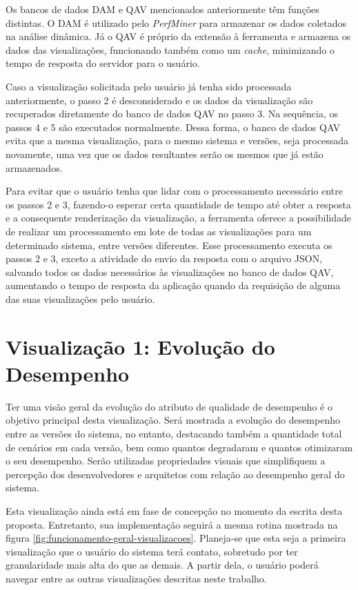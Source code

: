 Os bancos de dados DAM e QAV mencionados anteriormente têm funções distintas. O DAM é utilizado pelo \textit{PerfMiner} para armazenar os dados coletados na análise dinâmica. Já o QAV é próprio da extensão à ferramenta e armazena os dados das visualizações, funcionando também como um \textit{cache}, minimizando o tempo de resposta do servidor para o usuário.

Caso a visualização solicitada pelo usuário já tenha sido processada anteriormente, o passo 2 é desconsiderado e os dados da visualização são recuperados diretamente do banco de dados QAV no passo 3. Na sequência, os passos 4 e 5 são executados normalmente. Dessa forma, o banco de dados QAV evita que a mesma visualização, para o mesmo sistema e versões, seja processada novamente, uma vez que os dados resultantes serão os mesmos que já estão armazenados.

Para evitar que o usuário tenha que lidar com o processamento necessário entre os passos 2 e 3, fazendo-o esperar certa quantidade de tempo até obter a resposta e a consequente renderização da visualização, a ferramenta oferece a possibilidade de realizar um processamento em lote de todas as visualizações para um determinado sistema, entre versões diferentes. Esse processamento executa os passos 2 e 3, exceto a atividade do envio da resposta com o arquivo JSON, salvando todos os dados necessários às visualizações no banco de dados QAV, aumentando o tempo de resposta da aplicação quando da requisição de alguma das suas visualizações pelo usuário.

\section{Visualização 1: Evolução do Desempenho} \label{sec:visualizacao1}

Ter uma visão geral da evolução do atributo de qualidade de desempenho é o objetivo principal desta visualização. Será mostrada a evolução do desempenho entre as versões do sistema, no entanto, destacando também a quantidade total de cenários em cada versão, bem como quantos degradaram e quantos otimizaram o seu desempenho. Serão utilizadas propriedades visuais que simplifiquem a percepção dos desenvolvedores e arquitetos com relação ao desempenho geral do sistema.

Esta visualização ainda está em fase de concepção no momento da escrita desta proposta. Entretanto, sua implementação seguirá a mesma rotina mostrada na figura \ref{fig:funcionamento-geral-visualizacoes}. Planeja-se que esta seja a primeira visualização que o usuário do sistema terá contato, sobretudo por ter granularidade mais alta do que as demais. A partir dela, o usuário poderá navegar entre as outras visualizações descritas neste trabalho.

